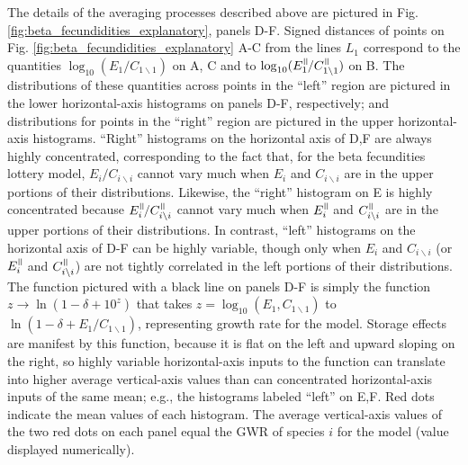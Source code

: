 \documentclass[letterpaper,11pt]{article}
\newcommand{\nat}{%
\text{\hspace{-1.5pt}
\begin{tikzpicture}[scale=1.8]%
\draw (.333ex,0) -- (.333ex,1ex);%
\draw (.666ex,0) -- (.666ex,1ex);
\end{tikzpicture}%
}}
\newcommand{\bs}{\backslash}
\begin{document}
The details of the averaging processes described above are pictured in 
Fig. \ref{fig:beta_fecundidities_explanatory}, panels D-F. 
Signed distances of points on Fig. \ref{fig:beta_fecundidities_explanatory} 
A-C from the lines $L_1$ correspond to 
the quantities $\log_{10}(E_1/C_{1 \bs 1})$ on A, C and to 
$\log_{10}(E_1^\nat/C_{1 \bs 1}^\nat)$ on B. The distributions of these 
quantities across points in the ``left'' region are pictured 
in the lower horizontal-axis histograms on panels D-F, respectively;
and distributions for points in the ``right'' region are 
pictured in the upper horizontal-axis histograms. 
``Right'' histograms on the horizontal axis of D,F are always highly 
concentrated, corresponding to the fact that, for the beta fecundities
lottery model, $E_i/C_{i \bs i}$ cannot vary much when $E_i$ and 
$C_{i \bs i}$ are in the upper portions of their distributions. 
Likewise, the ``right'' histogram on E is highly concentrated because
$E_i^\nat/C_{i \bs i}^\nat$ cannot vary much when $E_i^\nat$ and 
$C_{i \bs i}^\nat$ are in the upper portions of their distributions.
In contrast, ``left'' histograms on the horizontal axis of D-F
can be highly variable, though only when $E_i$ and $C_{i \bs i}$
(or $E_i^\nat$ and $C_{i \bs i}^\nat$) are not tightly 
correlated in the left portions of their distributions.
The function pictured with a black line on panels D-F is simply the function
$z \rightarrow \ln(1-\delta+10^z)$ that takes $z=\log_{10}(E_1,C_{1 \bs 1})$
to $\ln(1-\delta+E_1/C_{1 \bs 1})$, representing growth rate for the model.
Storage effects are manifest by this function, because it is flat on the left and 
upward sloping on the right, so highly variable horizontal-axis inputs to the function
can translate into higher average vertical-axis values than can concentrated
horizontal-axis inputs of the same mean; e.g., the histograms labeled ``left'' on
E,F. Red dots indicate the mean values of
each histogram. The average vertical-axis values of the two red dots on each panel
equal the GWR of species $i$ for the model (value displayed numerically). 
\end{document}
